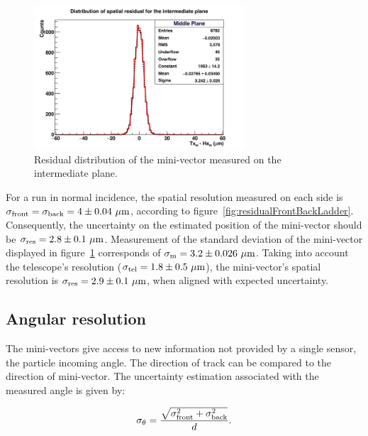     \begin{figure}[!h]
      \centering
      \includegraphics[width = 0.7\textwidth]{Pictures/deformation/hDiffPosX_226056.png}
      \caption{Residual distribution of the mini-vector measured on the intermediate plane.}
      \label{fig:residualMV}
    \end{figure}

    For a run in normal incidence, the spatial resolution measured on each side is $\sigma_{\rm{front}} = \sigma_{\rm{back}} = 4 \pm 0.04~\rm{\mu m}$, according to figure~\ref{fig:residualFrontBackLadder}.
    Consequently, the uncertainty on the estimated position of the mini-vector should be $\sigma_{\rm{res}} = 2.8 \pm 0.1~\rm{\mu m}$.
    Measurement of the standard deviation of the mini-vector displayed in figure~\ref{fig:residualMV} corresponds of $\sigma_{\rm{m}} = 3.2 \pm 0.026 ~\rm{\mu m}$.
    Taking into account the telescope's resolution ($\sigma_{\rm{tel}} = 1.8 \pm 0.5~\rm{\mu m}$), the mini-vector's spatial resolution is $\sigma_{\rm{res}} = 2.9 \pm 0.1~\rm{\mu m}$, when aligned with expected uncertainty.

   \subsection{Angular resolution}

   The mini-vectors give access to new information not provided by a single sensor, the particle incoming angle.
   The direction of track can be compared to the direction of mini-vector.
   The uncertainty estimation associated with the measured angle is given by:

   \begin{equation}
     \sigma_{\theta} = \frac{\sqrt{\sigma_{\rm{front}}^2 + \sigma_{\rm{back}}^2}}{d}.
     \label{eq:angularResolution}
   \end{equation}

